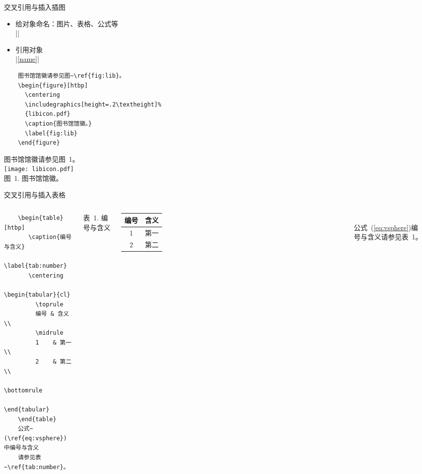     
    \begin{frame}[fragile]{交叉引用与插入插图}
      \begin{itemize}
      \item 给对象命名：图片、表格、公式等\\
      |\label{name}|
    \item 引用对象\\
      |\ref{name}|
      \end{itemize}
    \bigskip
    
      \begin{minipage}{0.7\linewidth}
        \begin{lstlisting}
    图书馆馆徽请参见图~\ref{fig:lib}。
    \begin{figure}[htbp]
      \centering
      \includegraphics[height=.2\textheight]%
      {libicon.pdf}
      \caption{图书馆馆徽。}
      \label{fig:lib}
    \end{figure}
    \end{lstlisting}
      \end{minipage}\hfill
      \begin{minipage}{0.3\linewidth}\centering
        {\songti 图书馆馆徽请参见图~1。}\\[1em]
     \texttt{[image: libicon.pdf]}\\
     {\footnotesize\heiti 图~1. 图书馆馆徽。}
      \end{minipage}
    \end{frame}
    
    \begin{frame}[fragile]{交叉引用与插入表格}
      \begin{columns}
      \begin{lstlisting}
    \begin{table}[htbp]
       \caption{编号与含义}
       \label{tab:number}
       \centering
       \begin{tabular}{cl}
         \toprule
         编号 & 含义 \\
         \midrule
         1    & 第一 \\
         2    & 第二 \\
         \bottomrule
       \end{tabular}
    \end{table}
    公式~(\ref{eq:vsphere}) 中编号与含义
    请参见表~\ref{tab:number}。
    \end{lstlisting}
    \centering
    {\small 表~1. 编号与含义}\\[2pt]
    \begin{tabular}{cl}\toprule
    编号 & 含义 \\\midrule
    1 & 第一\\
    2  & 第二\\\bottomrule
    \end{tabular}\\[5pt]
    
    \normalsize 公式~(\ref{eq:vsphere})编号与含义请参见表~1。
      \end{columns}
    \end{frame}
    
